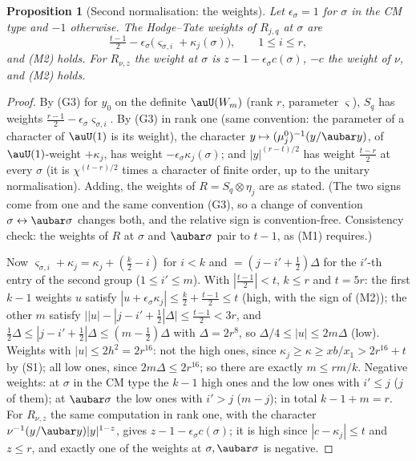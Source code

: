 \documentclass[10pt]{amsart}
\newtheorem{proposition}[theorem]{Proposition}
\theoremstyle{definition}
\theoremstyle{remark}
\begin{document}
\begin{proposition}[Second normalisation: the weights]\label{pga:weights}
Let $\epsilon_\sigma=1$ for $\sigma$ in the CM type and $-1$ otherwise. The Hodge--Tate weights of
$R_{j,q}$ at $\sigma$ are
\[
\tfrac{t-1}2-\epsilon_\sigma\bigl(\varsigma_{\sigma,i}+\kappa_j(\sigma)\bigr),\qquad1\le i\le r,
\]
and (M2) holds. For $R_{\nu,z}$ the weight at $\sigma$ is $z-1-\epsilon_\sigma c(\sigma)$, $-c$ the
weight of $\nu$, and (M2) holds.
\end{proposition}
\begin{proof}
By (G3) for $y_0$ on the definite $\auU(W_m)$ (rank $r$, parameter $\varsigma$), $S_q$ has weights
$\frac{r-1}2-\epsilon_\sigma\varsigma_{\sigma,i}$. By (G3) in rank one (same convention: the
parameter of a character of $\auU(1)$ is its weight), the character $y\mapsto(\mu_j^0)^{-1}(y/\aubar
y)$, of $\auU(1)$-weight $+\kappa_j$, has weight $-\epsilon_\sigma\kappa_j(\sigma)$; and $|y|^{(r-t)/
2}$ has weight $\frac{t-r}2$ at every $\sigma$ (it is $\chi^{(t-r)/2}$ times a character of finite
order, up to the unitary normalisation). Adding, the weights of $R=S_q\otimes\eta_j$ are as
stated. (The two signs come from one and the same convention (G3), so a change of convention
$\sigma\leftrightarrow\aubar\sigma$ changes both, and the relative sign is convention-free.
Consistency check: the weights of $R$ at $\sigma$ and $\aubar\sigma$ pair to $t-1$, as (M1)
requires.)

Now $\varsigma_{\sigma,i}+\kappa_j=\kappa_j+(\frac k2-i)$ for $i<k$ and $=(j-i'+\frac12)\Delta$ for
the $i'$-th entry of the second group ($1\le i'\le m$). With $|\frac{t-1}2|<t$, $k\le r$ and
$t=5r$: the first $k-1$ weights $u$ satisfy $|u+\epsilon_\sigma\kappa_j|\le\frac k2+\frac{t-1}2\le
t$ (high, with the sign of (M2)); the other $m$ satisfy $\bigl||u|-|j-i'+\frac12|\Delta\bigr|\le
\frac{t-1}2<3r$, and $\frac12\Delta\le|j-i'+\frac12|\Delta\le(m-\frac12)\Delta$ with $\Delta=2r^8$, so
$\Delta/4\le|u|\le2m\Delta$ (low). Weights with $|u|\le2h^2=2r^{16}$: not the high ones, since
$\kappa_j\ge\kappa\ge xb/x_1>2r^{16}+t$ by (S1); all low ones, since $2m\Delta\le2r^{16}$; so there
are exactly $m\le rm/k$. Negative weights: at $\sigma$ in the CM type the $k-1$ high ones and the
low ones with $i'\le j$ ($j$ of them); at $\aubar\sigma$ the low ones with $i'>j$ ($m-j$); in total
$k-1+m=r$. For $R_{\nu,z}$ the same computation in rank one, with the character
$\nu^{-1}(y/\aubar y)|y|^{1-z}$, gives $z-1-\epsilon_\sigma c(\sigma)$; it is high since
$|c-\kappa_j|\le t$ and $z\le r$, and exactly one of the weights at $\sigma,\aubar\sigma$ is
negative.
\end{proof}
\end{document}
